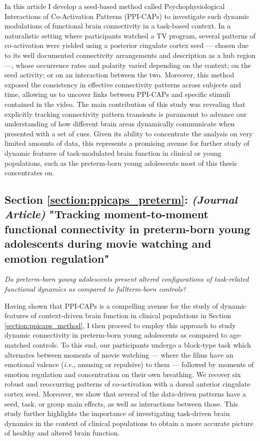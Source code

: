 In this article I develop a seed-based method called Psychophysiological Interactions of Co-Activation Patterns (PPI-CAPs) to investigate such dynamic modulations of functional brain connectivity in a task-based context. In a naturalistic setting where participants watched a TV program, several patterns of co-activation were yielded using a posterior cingulate cortex seed --- chosen due to its well documented connectivity arrangements \citep{Liu2013a, Karahanoglu2015a,Lin2017} and description as a hub region \citep{Andrews-hanna2010} ---, whose occurrence rates and polarity varied depending on the context; on the seed activity; or on an interaction between the two. Moreover, this method exposed the consistency in effective connectivity patterns across subjects and time, allowing us to uncover links between PPI-CAPs and specific stimuli contained in the video. The main contribution of this study was revealing that explicitly tracking connectivity pattern transients is paramount to advance our understanding of how different brain areas dynamically communicate when presented with a set of cues. Given its ability to concentrate the analysis on very limited amounts of data, this represents a promising avenue for further study of dynamic features of task-modulated brain function in clinical or young populations, such as the preterm-born young adolescents most of this thesis concentrates on. 


\subsection*{Section \ref{section:ppicaps_preterm}: \textit{(Journal Article)} "Tracking moment-to-moment functional connectivity in preterm-born young adolescents during movie watching and emotion regulation"}
\textit{Do preterm-born young adolescents present altered configurations of task-related functional dynamics as compared to fullterm-born controls?}

Having shown that PPI-CAPs is a compelling avenue for the study of dynamic features of context-driven brain function in clinical populations \citep{Freitas2020} in Section \ref{section:ppicaps_method}, I then proceed to employ this approach to study dynamic connectivity in preterm-born young adolescents as compared to age-matched controls. To this end, our participants undergo a block-type task which alternates between moments of movie watching --- where the films have an emotional valence (\textit{i.e.}, amusing or repulsive) to them ---  followed by moments of emotion regulation and concentration on their own breathing. We recover six robust and reoccurring patterns of co-activation with a dorsal anterior cingulate cortex seed. Moreover, we show that several of the data-driven patterns have a seed, task, or group main effects, as well as interactions between those. This study further highlights the importance of investigating task-driven brain dynamics in the context of clinical populations to obtain a more accurate picture of healthy and altered brain function.